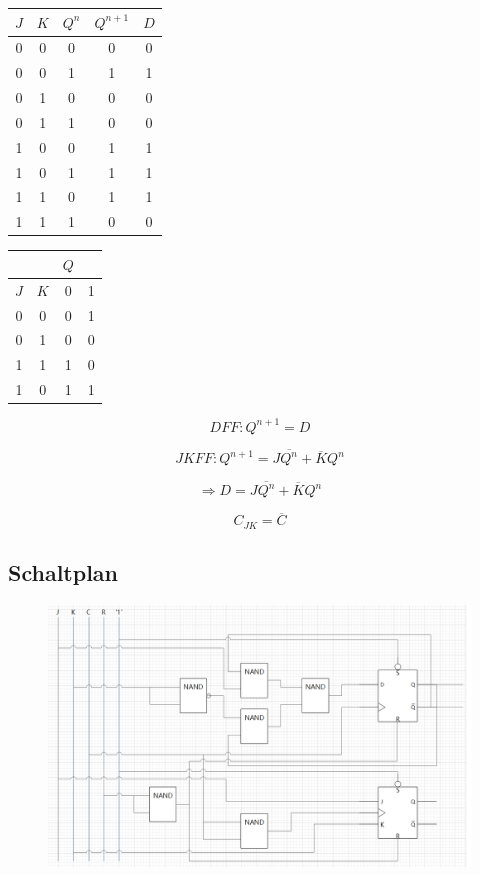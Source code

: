 \documentclass[fleqn]{article}
\begin{document}
\begin{tabular}{cc|cc|c}
    $J$&$K$&$Q^n$&$Q^{n+1}$&$D$\\
    \hline
    0&0&0&0&0\\
    0&0&1&1&1\\
    0&1&0&0&0\\
    0&1&1&0&0\\
    1&0&0&1&1\\
    1&0&1&1&1\\
    1&1&0&1&1\\
    1&1&1&0&0
\end{tabular} \qquad \qquad \qquad \qquad
\begin{tabular}{cc|cc}
    &&$Q$\\
    \hline
    $J$&$K$&0&1\\
    \hline
    0&0&0&1\\
    0&1&0&0\\
    1&1&1&0\\
    1&0&1&1
\end{tabular}

$$DFF: Q^{n+1} = D$$

$$JKFF: Q^{n+1} = J\overline{Q^{n}} + \overline{K}Q^{n}$$

$$\Rightarrow D = J\overline{Q^{n}} + \overline{K}Q^{n}$$

$$C_{JK} = \overline{C}$$

\subsection{Schaltplan}

\begin{figure}[!hb]
    \centering\includegraphics[width=6in]{bild1.png}
\end{figure}
\end{document}
